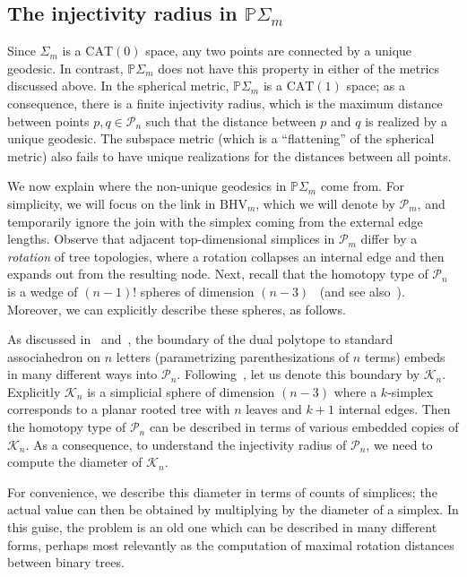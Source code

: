 \documentclass[a4paper,11pt]{article}
\newcommand{\CAT}{\textrm{CAT}}
\newcommand{\BHV}{\textrm{BHV}}
\newcommand{\aK}{\mathcal{K}}
\newcommand{\aP}{\mathcal{P}}
\begin{document}
\subsection{The injectivity radius in $\mathbb{P}\Sigma_m$}

Since $\Sigma_m$ is a $\CAT(0)$ space, any two points are connected by a unique geodesic.
In contrast, $\mathbb{P}\Sigma_m$ does not have this property in either of the metrics discussed above.
In the spherical metric, $\mathbb{P}\Sigma_m$ is a $\CAT(1)$ space; as a consequence, there is a finite injectivity radius, which is the maximum distance between points $p,q \in \aP_n$ such that the distance between $p$ and $q$ is realized by a unique geodesic.
The subspace metric (which is a ``flattening'' of the spherical metric) also fails to have unique realizations for the distances between all points.

We now explain where the non-unique geodesics in $\mathbb{P}\Sigma_m$ come from.
For simplicity, we will focus on the link in $\BHV_m$, which we will denote by $\aP_m$, and temporarily ignore the join with the simplex coming from the external edge lengths.
Observe that adjacent top-dimensional simplices in $\aP_m$ differ by a {\em rotation} of tree topologies, where a rotation collapses an internal edge and then expands out from the resulting node.
Next, recall that the homotopy type of $\aP_n$ is a wedge of $(n-1)!$ spheres of dimension $(n-3)$~\cite{robinson1996tree} (and see also~\cite[Thm. 6]{devadoss2014polyhedral}).
Moreover, we can explicitly describe these spheres, as follows.

As discussed in~\cite[Prop. 1]{devadoss2014polyhedral} and~\cite[\S 3.1]{billera2001geometry}, the boundary of the dual polytope to standard associahedron on $n$ letters (parametrizing parenthesizations of $n$ terms) embeds in many different ways into $\aP_n$.
Following~\cite{devadoss2014polyhedral}, let us denote this boundary by $\aK_n$.
Explicitly $\aK_n$ is a simplicial sphere of dimension $(n-3)$ where a $k$-simplex corresponds to a planar rooted tree with $n$ leaves and $k+1$ internal edges.
Then the homotopy type of $\aP_n$ can be described in terms of various embedded copies of $\aK_n$.
As a consequence, to understand the injectivity radius of $\aP_n$, we need to compute the diameter of $\aK_n$.

For convenience, we describe this diameter in terms of counts of simplices; the actual value can then be obtained by multiplying by the diameter of a simplex.
In this guise, the problem is an old one which can be described in many different forms, perhaps most relevantly as the computation of maximal rotation distances between binary trees.
\end{document}
